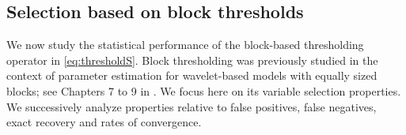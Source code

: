 \documentclass[aos]{imsart}
\theoremstyle{plain}
\newcommand{\david}[1]{{\small{\color{blue} \sf $\heartsuit$ David: #1}}}
\newcommand{\paul}[1]{{\small{\color{green} \sf $\spadesuit$ Paul: #1}}}
\newcommand{\bs}{\boldsymbol}
\begin{document}



\subsection{Selection based on block thresholds}
\label{ssec:block_thresholds}


We now study the statistical performance of the block-based thresholding operator in \eqref{eq:thresholdS}.
Block thresholding was previously studied in the context of parameter estimation for wavelet-based models with equally sized blocks; see Chapters 7 to 9 in \cite{johnstone}. %
We focus here on its variable selection properties. We successively analyze properties relative to false positives, false negatives, exact recovery and rates of convergence.  
\bigskip
\end{document}
